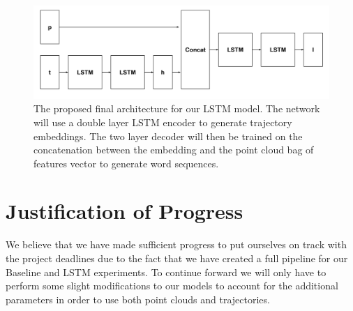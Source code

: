 \documentclass[letterpaper, 12 pt, conference]{ieeeconf}
\begin{document}
\begin{figure}[h]
\centering
\includegraphics[scale=0.15]{Tuple_LSTM}
\caption{The proposed final architecture for our LSTM model. The network will use a double layer LSTM encoder to generate trajectory embeddings. The two layer decoder will then be trained on the concatenation between the embedding and the point cloud bag of features vector to generate word sequences.}
\end{figure}

\section{Justification of Progress}

We believe that we have made sufficient progress to put ourselves on track with the project deadlines due to the fact that we have created a full pipeline for our Baseline and LSTM experiments. To continue forward we will only have to perform some slight modifications to our models to account for the additional parameters in order to use both point clouds and trajectories.


%


\end{document}
